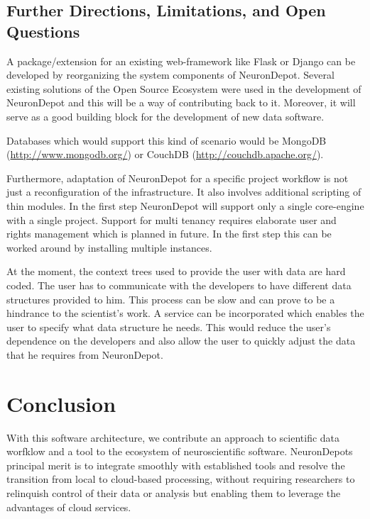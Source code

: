 \documentclass{frontiersSCNS} %
\begin{document}
\subsection{Further Directions, Limitations, and Open Questions}

A package/extension for an existing web-framework like Flask or Django can be
developed by reorganizing the system components of NeuronDepot.  Several
existing solutions of the Open Source Ecosystem were used in the development of
NeuronDepot and this will be a way of contributing back to it.  Moreover, it
will serve as a good building block for the development of new data software.

Databases which
would support this kind of scenario would be MongoDB
(\url{http://www.mongodb.org/}) or CouchDB (\url{http://couchdb.apache.org/}).

Furthermore, adaptation of NeuronDepot for a specific project workflow is not
just a reconfiguration of the infrastructure. It also involves additional
scripting of thin modules. In the first step NeuronDepot will support only a
single core-engine with a single project. Support for multi tenancy
requires elaborate user and rights management which is planned in future. In
the first step this can be worked around by installing multiple instances.

At the moment, the context trees used to provide the user with data are hard
coded. The user has to communicate with the developers to have different data
structures provided to him. This process can be slow and can prove to be a
hindrance to the scientist's work. A service can be incorporated which enables
the user to specify what data structure he needs. This would reduce the user's
dependence on the developers and also allow the user to quickly adjust the data
that he requires from NeuronDepot.

\section{Conclusion}
With this software architecture, we contribute an approach to scientific data
worfklow and a tool to the ecosystem of neuroscientific software.  NeuronDepots
principal merit is to integrate smoothly with established tools and resolve the
transition from local to cloud-based processing, without requiring researchers
to relinquish control of their data or analysis but enabling them to leverage
the advantages of cloud services.
\end{document}
